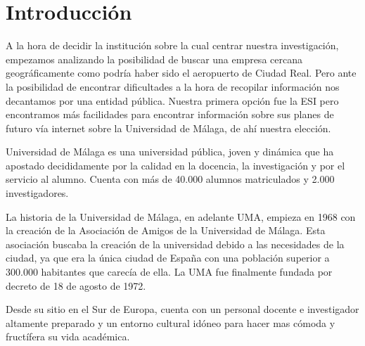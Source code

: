 \documentclass[12pt,a4paper,spanish,twoside]{book}
\begin{document}
\chapter*{Introducción}
A la hora de decidir la institución sobre la cual centrar nuestra 
investigación, empezamos analizando la posibilidad de buscar una empresa 
cercana geográficamente como podría haber sido el aeropuerto de Ciudad Real. 
Pero ante la posibilidad de encontrar dificultades a la hora de recopilar 
información nos decantamos por una entidad pública. Nuestra primera opción fue
la ESI pero encontramos más facilidades para encontrar información sobre sus 
planes de futuro vía internet sobre la Universidad de Málaga, de ahí nuestra 
elección.

Universidad de Málaga es una universidad pública, joven y dinámica que ha 
apostado decididamente por la calidad en la docencia, la investigación y por el
servicio al alumno. Cuenta con más de 40.000 alumnos matriculados y 2.000 
investigadores. 

La historia de la Universidad de Málaga, en adelante UMA, empieza en 1968 con 
la creación de la Asociación de Amigos de la Universidad de Málaga. Esta 
asociación buscaba la creación de la universidad debido a las necesidades de la 
ciudad, ya que era la única ciudad de España con una población superior a 
300.000 habitantes que carecía de ella. La UMA fue finalmente 
fundada por decreto de 18 de agosto de 1972.

Desde su sitio en el Sur de Europa, cuenta con un personal docente e 
investigador altamente preparado y un entorno cultural idóneo para hacer mas 
cómoda y fructífera su vida académica.
\end{document}
